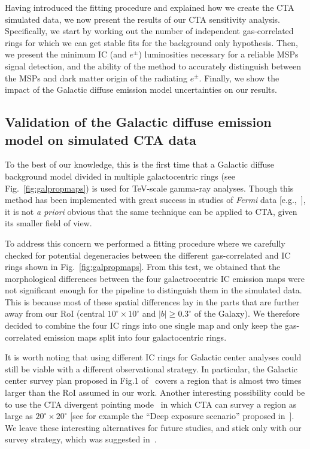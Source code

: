 \documentclass[doublespace,nopageskip]{VTthesis} %
\begin{document}
Having introduced the fitting procedure and explained how we create the CTA simulated data, we now present the results of our CTA sensitivity analysis.
Specifically, we start by working out the number of independent gas-correlated rings for which we can get stable fits for the background only hypothesis. Then, we present the minimum IC (and $e^\pm$) luminosities necessary for a reliable MSPs signal detection, and the ability of the method to accurately distinguish between the MSPs and dark matter origin of the radiating $e^\pm$. Finally, we show the impact of the Galactic diffuse emission model uncertainties on our results.

\subsection{Validation of the Galactic diffuse emission model on simulated CTA data}
\label{subsec:validationGDE}

To the best of our knowledge, this is the first time that a Galactic diffuse background model divided in multiple galactocentric rings (see Fig.~\ref{fig:galpropmaps}) is used for TeV-scale gamma-ray analyses. Though this method has been implemented with great success in studies of \textit{Fermi} data [e.g.,~\citet{2020ApJS..247...33A}], it is not {\it a priori} obvious that the same technique can be applied to CTA, given its smaller field of view.

To address this concern
we performed a fitting procedure where we carefully checked for potential degeneracies between the different gas-correlated and IC rings shown in Fig.~\ref{fig:galpropmaps}. From this test, we obtained that the morphological differences between the four galactrocentric IC emission maps were not significant enough for the pipeline to distinguish them in the simulated data. This is because most of these spatial differences lay in the parts that are further away from our RoI (central $10^\circ\times10^\circ$ and $|b|\geq0.3^\circ$ of the Galaxy). We therefore decided to
combine the four IC rings into one single map and only keep the gas-correlated emission
maps split into four galactocentric rings.

It is worth noting that using different IC rings for Galactic center analyses could still be viable with a different observational strategy. In particular, the Galactic center survey plan proposed in Fig.1 of~\citet{2021JCAP...01..057A} covers a region that is almost two times larger than the RoI assumed in our work. Another interesting possibility could be to use the CTA divergent pointing mode~\citep{2015ICRC...34..725G} in which CTA can survey a region as large as $20^\circ \times 20^\circ$ [see for example the ``Deep exposure scenario'' proposed in~\cite{2021PDU....3200845C}]. We leave these interesting alternatives for future studies, and stick only with our survey strategy, which was suggested in~\citet{2021PhRvD.103b3011R}. 
\end{document}
